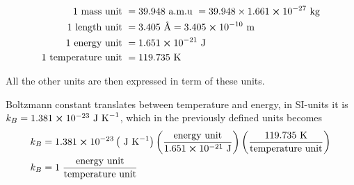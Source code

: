 \documentclass[11pt]{article}
\begin{document}
		\begin{align}
			1 \text{ mass unit } &=   39.948 \text{ a.m.u } =  39.948\times 1.661\cross 10^{-27} \text{ kg}
			\\
			1 \text{ length unit } &= 3.405 \text{ \AA} = 3.405\cross 10^{-10} \text{ m}
			\\
			1 \text{ energy unit } &= 1.651 \cross 10^{-21} \text{ J}
			\\
			1 \text{ temperature unit } &= 119.735 \text{ K}
		\end{align}


	All the other units are then expressed in term of these units.

	Boltzmann constant translates between temperature and energy, in SI-units it is \( k_B = 1.381 \cross 10^{-23} \text{ J K}^{-1}\), which in the previously defined units becomes
	\begin{align}
	k_B &= 1.381 \cross 10^{-23}  \left(\text{ J K}^{-1}\right)  \left(\frac{\text{energy unit}}{1.651 \cross 10^{-21} \text{ J}}\right)
	\left( \frac{119.735 \text{ K}}{\text{temperature unit}} \right)
	\\
	k_B &= 1 \; \frac{\text{energy unit}}{\text{temperature unit}}
	\end{align}




























{}

		
\end{document}
